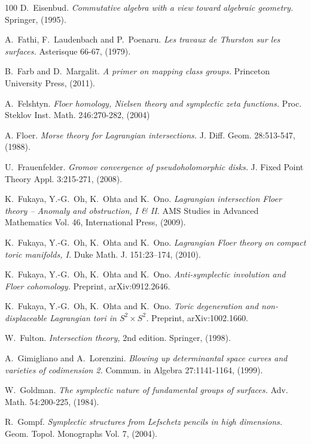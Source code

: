 \documentclass[reqno,10pt]{amsart}
\numberwithin{equation}{section}
\theoremstyle{remark}
\begin{document}
\begin{thebibliography}{100}
D.~Eisenbud.
\emph{Commutative algebra with a view toward algebraic geometry.}
Springer, (1995).

A.~Fathi, F.~Laudenbach and P.~Poenaru.
\emph{Les travaux de Thurston sur les surfaces.}
Asterisque 66-67, (1979).

B.~Farb and D.~Margalit.
\emph{A primer on mapping class groups.}
Princeton University Press, (2011).



A.~Felshtyn.
\emph{Floer homology, Nielsen theory and symplectic zeta functions.}
Proc. Steklov Inst. Math. 246:270-282, (2004)

A. Floer.
\emph{Morse theory for Lagrangian intersections.}
J. Diff. Geom. 28:513-547, (1988).

U.~Frauenfelder.
\emph{Gromov convergence of pseudoholomorphic disks.}
J. Fixed Point Theory Appl. 3:215-271, (2008).


K.~Fukaya, Y.-G.~Oh, K.~Ohta and K.~Ono.
\emph{Lagrangian intersection Floer theory -- Anomaly and obstruction, I \& II.}
AMS Studies in Advanced Mathematics Vol. 46, International Press, (2009).

K.~Fukaya, Y.-G.~Oh, K.~Ohta and K.~Ono.
\emph{Lagrangian Floer theory on compact toric manifolds, I.}
Duke Math. J. 151:23--174, (2010).

K.~Fukaya, Y.-G.~Oh, K.~Ohta and K.~Ono.
\emph{Anti-symplectic involution and Floer cohomology.}
Preprint, arXiv:0912.2646.

K.~Fukaya, Y.-G.~Oh, K.~Ohta and K.~Ono.
\emph{Toric degeneration and non-displaceable Lagrangian tori in $S^2 \times S^2$.}
Preprint, arXiv:1002.1660.

W.~Fulton.
\emph{Intersection theory,} 2nd edition.
Springer, (1998).

A.~Gimigliano and A.~Lorenzini.
\emph{Blowing up determinantal space curves and varieties of codimension 2.}
Commun. in Algebra 27:1141-1164, (1999).

W.~Goldman.
\emph{The symplectic nature of fundamental groups of surfaces.}
Adv. Math. 54:200-225, (1984).

R.~Gompf.
\emph{Symplectic structures from Lefschetz pencils in high dimensions.}
Geom. Topol. Monographs Vol. 7, (2004).




\end{thebibliography}
\end{document}
